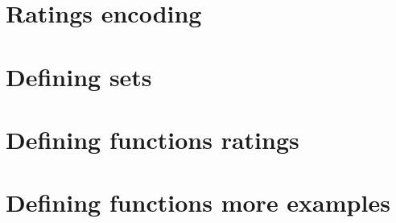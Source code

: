 
\section*{Ratings encoding}

\vfill
\section*{Defining sets}

\vfill
\section*{Defining functions ratings}

\vfill
\section*{Defining functions more examples}

\vfill
